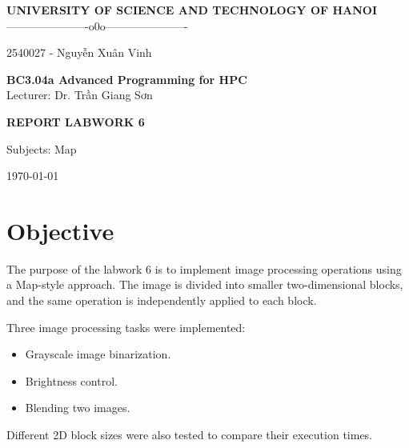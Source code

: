 \documentclass[11pt]{article}
\begin{document}
\begin{center}

{\Large \textbf{UNIVERSITY OF SCIENCE AND TECHNOLOGY OF HANOI}}\\
\vspace{0.3cm}
----------------------o0o----------------------\\

\vspace{4cm}

{\large
\centerline{2540027 - Nguyễn Xuân Vinh}
}

\vspace{4cm}

{\Huge \textbf{BC3.04a Advanced Programming for HPC}}\\
\vspace{0.5cm}
Lecturer: Dr. Trần Giang Sơn

\vspace{4cm}

{\Large \textbf{REPORT LABWORK 6}}\\

\vspace{0.5cm}

{\large
Subjects: Map
}

\vspace{4cm}
\today
\end{center}

\newpage

\newpage

\tableofcontents

\newpage

\section{Objective}

The purpose of the labwork 6 is to implement image processing operations using a Map-style approach. The image is divided into smaller two-dimensional blocks, and the same operation is independently applied to each block.

Three image processing tasks were implemented:

\begin{itemize}
\item Grayscale image binarization.
\item Brightness control.
\item Blending two images.
\end{itemize}

Different 2D block sizes were also tested to compare their execution times.
\end{document}
